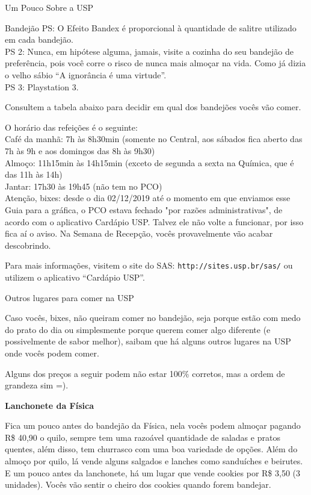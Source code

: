 \begin{secao}{Um Pouco Sobre a USP}
\begin{subsecao}{Bandejão}
PS: O Efeito Bandex é proporcional à quantidade de salitre utilizado em cada
bandejão.\\
PS 2: Nunca, em hipótese alguma, jamais, visite a cozinha do seu bandejão de
preferência, pois você corre o risco de nunca mais almoçar na vida. Como já
dizia o velho sábio ``A ignorância é uma virtude''.\\
PS 3: Playstation 3.

Consultem a tabela abaixo para decidir em qual dos bandejões vocês vão comer.

O horário das refeições é o seguinte:\\
Café da manhã: 7h às 8h30min (somente no Central, aos sábados fica aberto das
7h às 9h e aos domingos das 8h às 9h30)\\
Almoço: 11h15min às 14h15min (exceto de segunda a sexta na Química, que é das 11h às 14h)\\
Jantar: 17h30 às 19h45 (não tem no PCO)\\

Atenção, bixes: desde o dia 02/12/2019 até o momento em que enviamos esse Guia
para a gráfica, o PCO estava fechado "por razões administrativas", de acordo
com o aplicativo Cardápio USP. Talvez ele não volte a funcionar, por isso fica
aí o aviso. Na Semana de Recepção, vocês provavelmente vão acabar descobrindo.

Para mais informações, visitem o site do SAS: {\tt http://sites.usp.br/sas/} ou
utilizem o aplicativo ``Cardápio USP''.

\end{subsecao}

\begin{subsecao}{Outros lugares para comer na USP}

Caso vocês, bixes, não queiram comer no bandejão, seja porque estão com medo do
prato do dia ou simplesmente porque querem comer algo diferente (e
possivelmente de sabor melhor), saibam que há alguns outros lugares na USP onde
vocês podem comer.

Alguns dos preços a seguir podem não estar 100\% corretos, mas a ordem de
grandeza sim =).

{\bf Lanchonete da Física}

Fica um pouco antes do bandejão da Física, nela vocês podem almoçar pagando R\$
40,90 o quilo, sempre tem uma razoável quantidade de saladas e pratos
quentes, além disso, tem churrasco com uma boa variedade de opções.
Além do almoço por quilo, lá vende alguns salgados e lanches como sanduíches e
beirutes. E um pouco antes da lanchonete, há um lugar que vende cookies por R\$
3,50 (3 unidades). Vocês vão sentir o cheiro dos cookies quando forem bandejar.


\end{subsecao}
\end{secao}
